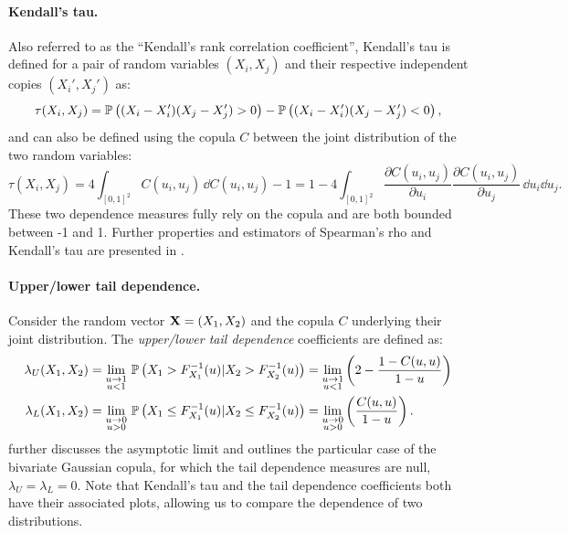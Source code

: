 \paragraph{Kendall's tau.} 
Also referred to as the ``Kendall's rank correlation coefficient'', Kendall's tau is defined for a pair of random variables $(X_i, X_j)$ and their respective independent copies $(X_i', X_j')$ as: 
\begin{equation}
    \tau(X_i, X_j) = \P\left((X_i - X_i')(X_j - X_j') > 0 \right) - \P\left((X_i - X_i')(X_j - X_j') < 0 \right),
\end{equation}
and can also be defined using the copula $C$ between the joint distribution of the two random variables: 
\begin{equation}
    \tau(X_i, X_j) = 4 \int_{[0, 1]^2} C(u_i, u_j) \, \dd C(u_i, u_j) - 1 = 1 - 4 \int_{[0, 1]^2} \frac{\partial C(u_i, u_j)}{\partial u_i} \frac{\partial C(u_i, u_j)}{\partial u_j} \, \dd u_i \dd u_j. 
\end{equation}
These two dependence measures fully rely on the copula and are both bounded between -1 and 1. 
Further properties and estimators of Spearman's rho and Kendall's tau are presented in \citet[Section 2.4]{durante_2015_copula}. 

\paragraph{Upper/lower tail dependence.} 
Consider the random vector $\bX = (X_1, X_2)$ and the copula $C$ underlying their joint distribution. 
The \textit{upper/lower tail dependence} coefficients are defined as: 
\begin{subequations}
    \begin{align}
        \lambda_U(X_1, X_2) &= \lim_{\substack{u \rightarrow 1 \\ u<1}} \, \P\left(X_1 > F_{X_1}^{-1}(u) | X_2 > F_{X_2}^{-1}(u)\right) =       \lim_{\substack{u \rightarrow 1 \\ u<1}} \left(2 - \frac{1 - C(u, u)}{1 - u}\right)\\
        \lambda_L(X_1, X_2) &= \lim_{\substack{u \rightarrow 0 \\ u>0}} \, \P\left(X_1 \leq F_{X_1}^{-1}(u) | X_2 \leq F_{X_2}^{-1}(u)\right) = \lim_{\substack{u \rightarrow 0 \\ u>0}} \left(\frac{C(u, u)}{1 - u}\right). 
    \end{align}
\end{subequations}
\cite{joe_2014} further discusses the asymptotic limit and outlines the particular case of the bivariate Gaussian copula, for which the tail dependence measures are null, $\lambda_U = \lambda_L = 0$.
Note that Kendall's tau and the tail dependence coefficients both have their associated plots, allowing us to compare the dependence of two distributions.

